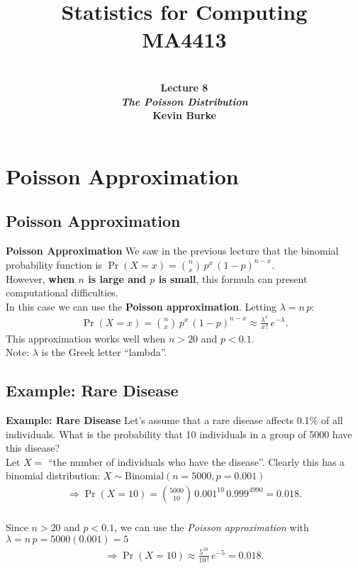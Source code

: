\documentclass[compress]{beamer}        %
\title{{\huge Statistics for Computing\\[0.1cm]MA4413}}
\author[Kevin Burke]{{\bf\\[0.5cm]{\huge Lecture 8}\\[0.2cm]\emph{The Poisson Distribution}\\[1.4cm]Kevin Burke}\\[0.3cm]\tcb{kevin.burke@ul.ie}}
\institute[University of Limerick, Maths \& Stats Dept]{}
\date{}
\makeatletter
\newcommand{\tcb}{\textcolor{beamer@blendedblue}}
\makeatother
\begin{document}
\begin{frame}[t]
\titlepage
\end{frame}




\section{Poisson Approximation}
\subsection{Poisson Approximation}
\begin{frame}{\bf \tcb{Poisson Approximation}}
We saw in the previous lecture that the binomial probability function is $\Pr(X=x) = \binom{n}{x}\,p^x\,(1-p)^{n-x}$.\\[0.4cm]

However, {\bf when {\boldmath$n$} is large and {\boldmath$p$} is small}, this formula can present computational difficulties.\\[0.4cm]

In this case we can use the {\bf Poisson approximation}. Letting $\lambda = n\,p$:
\begin{align*}
\boxed{\Pr(X=x) = \binom{n}{x}\,p^x\,(1-p)^{n-x} \approx \frac{\lambda^x}{x\,!}\, e^{-\lambda}}.
\end{align*}
This approximation works well when $n > 20$ and $p < 0.1$.\\[0.5cm]

Note: $\lambda$ is the Greek letter ``lambda''.

\end{frame}


\subsection{Example: Rare Disease}
\begin{frame}{\bf \tcb{Example: Rare Disease}}
Let's assume that a rare disease affects 0.1\% of all individuals. What is the probability that 10 individuals in a group of 5000 have this disease?\\[0.4cm]

Let $X =$ ``the number of individuals who have the disease''. Clearly this has a binomial distribution: $X \sim \text{Binomial}(n=5000, p=0.001)$
\begin{align*}
\Rightarrow \Pr(X = 10) = \binom{5000}{10} \, 0.001^{10} \, 0.999^{4990} = 0.018.\\
\end{align*}


Since $n > 20$ and $p < 0.1$, we can use the \emph{Poisson approximation} with $\lambda = n\,p = 5000(0.001) = 5$
\begin{align*}
\Rightarrow \Pr(X = 10) \approx \frac{5^{10}}{10\,!}\, e^{-5} = 0.018.
\end{align*}

\end{frame}
\end{document}

